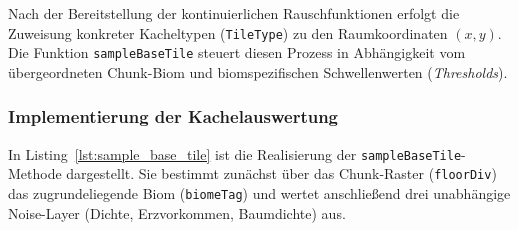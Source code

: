 \documentclass[
  a4paper,
  11pt,
  twoside,
  BCOR=8mm,           %
  headings=big,
  numbers=noenddot,
  listof=totoc,       %
  captions=tableheading,
]{scrreprt}
\begin{document}
Nach der Bereitstellung der kontinuierlichen Rauschfunktionen erfolgt die Zuweisung konkreter Kacheltypen (\texttt{TileType}) zu den Raumkoordinaten $(x, y)$. Die Funktion \texttt{sampleBaseTile} steuert diesen Prozess in Abhängigkeit vom übergeordneten Chunk-Biom und biomspezifischen Schwellenwerten (\textit{Thresholds}).

\subsubsection{Implementierung der Kachelauswertung}
In Listing~\ref{lst:sample_base_tile} ist die Realisierung der \texttt{sampleBaseTile}-Methode dargestellt. Sie bestimmt zunächst über das Chunk-Raster (\texttt{floorDiv}) das zugrundeliegende Biom (\texttt{biomeTag}) und wertet anschließend drei unabhängige Noise-Layer (Dichte, Erzvorkommen, Baumdichte) aus.
\end{document}
